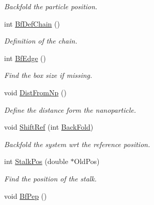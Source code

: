 \begin{DoxyCompactItemize}
\begin{DoxyCompactList}\small\item\em Backfold the particle position. \end{DoxyCompactList}\item 
int \hyperlink{classVarData_a0826d64fb693577d667b53d50e53abb5}{Bf\+Def\+Chain} ()\hypertarget{classVarData_a0826d64fb693577d667b53d50e53abb5}{}\label{classVarData_a0826d64fb693577d667b53d50e53abb5}

\begin{DoxyCompactList}\small\item\em Definition of the chain. \end{DoxyCompactList}\item 
int \hyperlink{classVarData_af16fce4f3d2abd5981a02ce3a9bf0ee3}{Bf\+Edge} ()\hypertarget{classVarData_af16fce4f3d2abd5981a02ce3a9bf0ee3}{}\label{classVarData_af16fce4f3d2abd5981a02ce3a9bf0ee3}

\begin{DoxyCompactList}\small\item\em Find the box size if missing. \end{DoxyCompactList}\item 
void \hyperlink{classVarData_ae1ce909c47c5e9f7aa655b443dd74af0}{Dist\+From\+Np} ()\hypertarget{classVarData_ae1ce909c47c5e9f7aa655b443dd74af0}{}\label{classVarData_ae1ce909c47c5e9f7aa655b443dd74af0}

\begin{DoxyCompactList}\small\item\em Define the distance form the nanoparticle. \end{DoxyCompactList}\item 
void \hyperlink{classVarData_a42c97b08cf848bfaa9d68951070243d2}{Shift\+Ref} (int \hyperlink{classVarData_a76c0ae2bedaaafb3da1cb7019035b602}{Back\+Fold})\hypertarget{classVarData_a42c97b08cf848bfaa9d68951070243d2}{}\label{classVarData_a42c97b08cf848bfaa9d68951070243d2}

\begin{DoxyCompactList}\small\item\em Backfold the system wrt the reference position. \end{DoxyCompactList}\item 
int \hyperlink{classVarData_a368f70b601610ec1c3b3155e681cfa83}{Stalk\+Pos} (double $\ast$Old\+Pos)\hypertarget{classVarData_a368f70b601610ec1c3b3155e681cfa83}{}\label{classVarData_a368f70b601610ec1c3b3155e681cfa83}

\begin{DoxyCompactList}\small\item\em Find the position of the stalk. \end{DoxyCompactList}\item 
void \hyperlink{classVarData_a71d64d583aa288c4bc45579df741ea07}{Bf\+Pep} ()\hypertarget{classVarData_a71d64d583aa288c4bc45579df741ea07}{}\label{classVarData_a71d64d583aa288c4bc45579df741ea07}


\end{DoxyCompactItemize}

